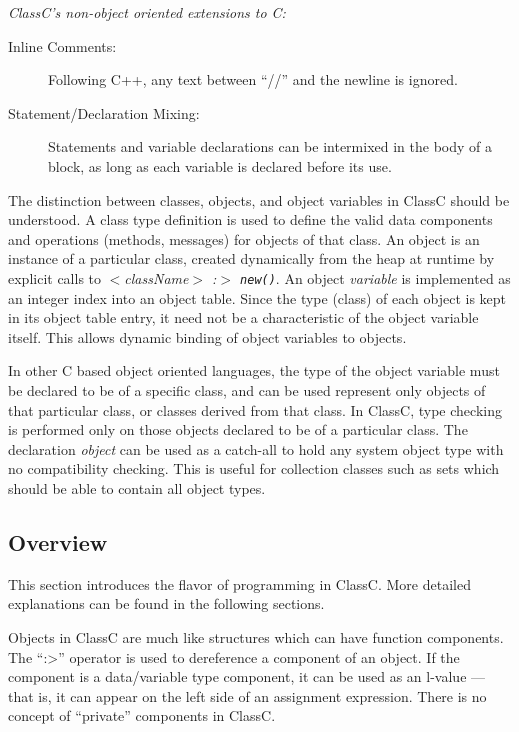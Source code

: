 {\flushleft \large \em ClassC's non-object oriented extensions to C:}
\begin{description}
\item[Inline Comments:]
Following C++, any text between ``//'' and the newline is ignored.
\item[Statement/Declaration Mixing:]
Statements and variable declarations can be intermixed in the body of a block,
as long as each variable is declared before its use.
\end{description}

The distinction between classes, objects, and object variables
in ClassC should be understood.
A class type definition is used to define the valid data
components and operations (methods, messages) for objects of that class.
An object is an instance of a particular class,
created dynamically from the heap at runtime by explicit calls to
{\em $<$className$>$ :$>$ \tt new()}.  An object
{\em variable}
is implemented as an integer index into an object table.  Since the type
(class) of each object is kept in its object table entry, it need not be a
characteristic of the object variable itself.  This allows dynamic binding of
object variables to objects.

In other C based object
oriented languages, the type of the object variable must be declared to be
of a specific class, and can be used represent only objects of that
particular class, or classes derived from that class.  In ClassC, type
checking is performed only on those objects declared to be of a particular
class.  The declaration
{\em object}
can be used as a catch-all to hold any system object type with no
compatibility checking.  This is useful for collection classes such as
sets which should be able to contain all object types.

\subsection{Overview}
This section introduces the flavor of programming in ClassC.  More detailed
explanations can be found in the following sections.

Objects in ClassC are much like structures which can have function components.
The ``:>'' operator is used to dereference a component of an object.  If the
component is a data/variable type component, it can be used as an l-value ---
that is, it can appear on the left side of an assignment expression.  There
is no concept of ``private'' components in ClassC.

